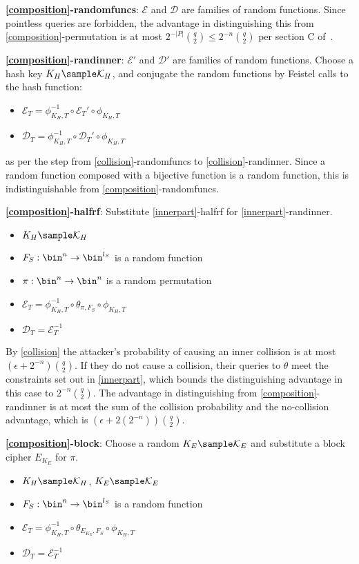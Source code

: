 \documentclass[journal=tosc,preprint,floatrow,submission]{iacrtrans}
\newcommand*{\xprm}[2]{\textsf{\ref*{#1}-#2}}
\newcommand*{\xprmtitle}[2]{\textbf{\xprm{#1}{#2}}}
\newcommand*{\calE}{\mathcal{E}}
\newcommand*{\calD}{\mathcal{D}}
\begin{document}
\xprmtitle{composition}{randomfuncs}: $\calE$ and $\calD$ are
families of random functions.
Since pointless queries are forbidden, the advantage in distinguishing this from
\xprm{composition}{permutation} is at most $2^{-|P|}\binom{q}{2} \leq 2^{-n}\binom{q}{2}$
per section C of~\cite{cmc}.

\xprmtitle{composition}{randinner}: $\calE'$ and $\calD'$ are families of random functions.
Choose a hash key $K_H \sample \mathcal{K}_H$,
and conjugate the random functions by Feistel calls to the hash function:

\begin{itemize}
    \item $\calE_T = \phi^{-1}_{K_H, T} \circ \calE_T' \circ \phi_{K_H, T}$
    \item $\calD_T = \phi^{-1}_{K_H, T} \circ \calD_T' \circ \phi_{K_H, T}$
\end{itemize}

as per the step from \xprm{collision}{randomfuncs}
to \xprm{collision}{randinner}.
Since a random function composed with a bijective function is a random function,
this is indistinguishable from \xprm{composition}{randomfuncs}.

\xprmtitle{composition}{halfrf}: Substitute \xprm{innerpart}{halfrf} for \xprm{innerpart}{randinner}.
\begin{itemize}
    \item $K_H \sample \mathcal{K}_H$
    \item $F_S: \bin^n \rightarrow \bin^{l_S}$ is a random function
    \item $\pi: \bin^n \rightarrow \bin^n$ is a random permutation
    \item $\calE_T = \phi^{-1}_{K_H, T} \circ \theta_{\pi, F_S} \circ \phi_{K_H, T}$
    \item $\calD_T = \calE_T^{-1}$
\end{itemize}

By \autoref{collision} the attacker's probability of causing an inner collision is at most
$(\epsilon + 2^{-n})\binom{q}{2}$. If they do not cause a collision,
their queries to $\theta$ meet the constraints set out in \autoref{innerpart}, which
bounds the distinguishing advantage in this case to $2^{-n}\binom{q}{2}$.
The advantage in distinguishing from \xprm{composition}{randinner}
is at most the sum of the collision probability and the no-collision advantage, which is
$(\epsilon + 2(2^{-n}))\binom{q}{2}$.

\xprmtitle{composition}{block}: Choose a random $K_E \sample \mathcal{K}_E$ and
substitute a block cipher $E_{K_E}$ for $\pi$.
\begin{itemize}
    \item $K_H \sample \mathcal{K}_H$, $K_E \sample \mathcal{K}_E$
    \item $F_S: \bin^n \rightarrow \bin^{l_S}$ is a random function
    \item $\calE_T = \phi^{-1}_{K_H, T} \circ \theta_{E_{K_E}, F_S} \circ \phi_{K_H, T}$
    \item $\calD_T = \calE_T^{-1}$
\end{itemize}
\end{document}
